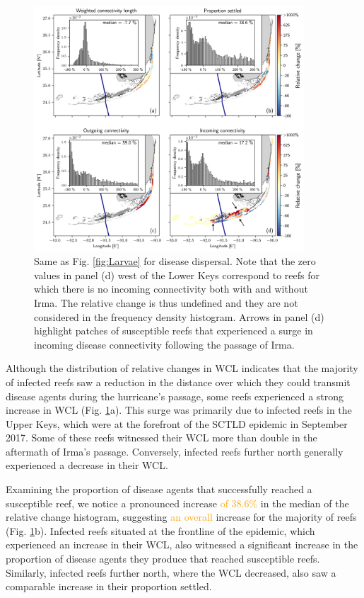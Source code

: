 \documentclass[fleqn,10pt]{wlscirep}
\newcommand{\modif}[1]{\textcolor{orange}{#1}}
\begin{document}
\begin{figure}[tbp]
    \centering
    \includegraphics[width=0.9\textwidth]{figures/fig_connex_sctld_b.png}
    \caption{Same as Fig. \ref{fig:Larvae} for disease dispersal. Note that the zero values in panel (d) west of the Lower Keys correspond to reefs for which there is no incoming connectivity both with and without Irma. The relative change is thus undefined and they are not considered in the frequency density histogram. Arrows in panel (d) highlight patches of susceptible reefs that experienced a surge in incoming disease connectivity following the passage of Irma. }
    \label{fig:SCTLD}
\end{figure}

Although the distribution of relative changes in WCL indicates that the majority of infected reefs saw a reduction in the distance over which they could transmit disease agents during the hurricane's passage, some reefs experienced a strong increase in WCL (Fig. \ref{fig:SCTLD}a). This surge was primarily due to infected reefs in the Upper Keys, which were at the forefront of the SCTLD epidemic in September 2017. Some of these reefs witnessed their WCL more than double in the aftermath of Irma's passage. Conversely, infected reefs further north generally experienced a decrease in their WCL.

Examining the proportion of disease agents that successfully reached a susceptible reef, we notice a pronounced increase \modif{of 38.6\%} in the median of the relative change histogram, suggesting \modif{an overall} increase for the majority of reefs (Fig. \ref{fig:SCTLD}b). Infected reefs situated at the frontline of the epidemic, which experienced an increase in their WCL, also witnessed a significant increase in the proportion of disease agents they produce that reached susceptible reefs. Similarly, infected reefs further north, where the WCL decreased, also saw a comparable increase in their proportion settled.
\end{document}
